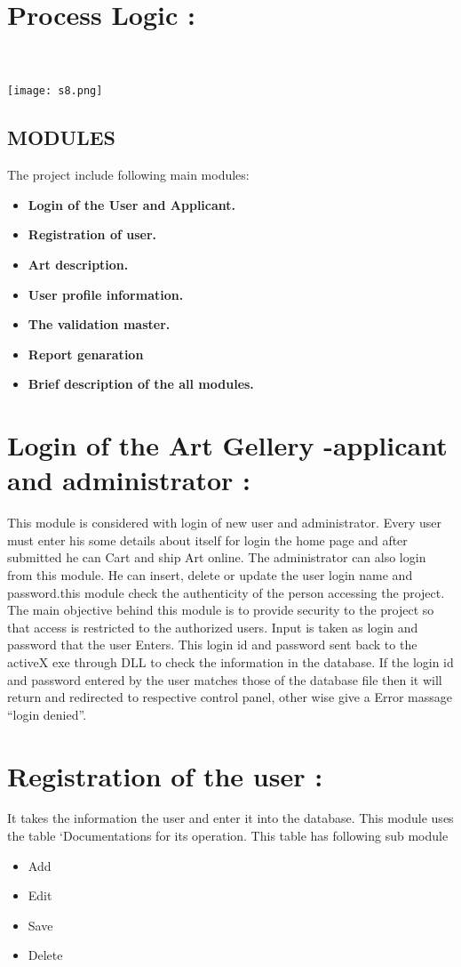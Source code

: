 \documentclass{article}
\begin{document}
\section*{Process Logic : }
\\
\\
\texttt{[image: s8.png]}
\begin{center}
    \section*{\textbf{MODULES}} 
\end{center}
The project include following main modules:
\\
\begin{itemize}
    \item \textbf{Login of the User and Applicant.}
\item \textbf{ Registration of user.}
\item \textbf{Art description.}
\item \textbf{ User profile information.}
\item \textbf{The validation master.}
\item \textbf{Report genaration}
\item \textbf{Brief description of the all modules.}
\end{itemize}
\section*{Login of the Art Gellery -applicant and administrator : }
This module is considered with login of new user and administrator. Every user must enter his some details about itself for login the home page and after submitted he can Cart and ship Art online. The administrator can also login from this module. He can insert, delete or update the user login name and password.this module check the authenticity of the person accessing the project. The main objective behind this module is to provide security to the project so that access is restricted to the authorized users.
            Input is taken as login and password that the user Enters.
            This login id and password sent back to the activeX exe through DLL to check the information in the database.
            If the login id and password entered by the user matches those of the database file then it will return and redirected to respective control panel, other wise give a Error massage “login denied”.
\section*{Registration of the user : }
It takes the information the user and enter it into the database. This module uses the table ‘Documentations for its operation.
This table has following sub module
\begin{itemize}
    \item Add
\item Edit
\item Save
\item Delete
\end{itemize}
\\
\end{document}
